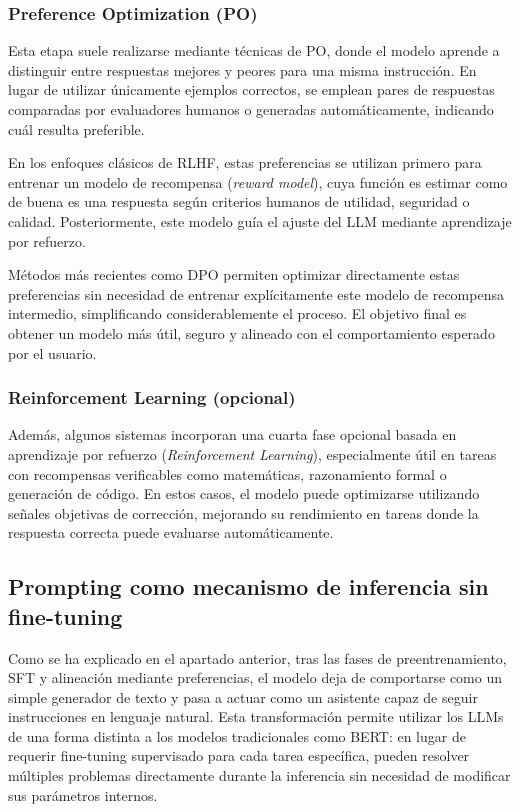 \subsubsection*{Preference Optimization (PO)}

Esta etapa suele realizarse mediante técnicas de \ac{PO}, donde el modelo aprende a distinguir entre respuestas mejores y peores para una misma instrucción. En lugar de utilizar únicamente ejemplos correctos, se emplean pares de respuestas comparadas por evaluadores humanos o generadas automáticamente, indicando cuál resulta preferible.

En los enfoques clásicos de \ac{RLHF}, estas preferencias se utilizan primero para entrenar un modelo de recompensa (\textit{reward model}), cuya función es estimar como de buena es una respuesta según criterios humanos de utilidad, seguridad o calidad. Posteriormente, este modelo guía el ajuste del \ac{LLM} mediante aprendizaje por refuerzo.

Métodos más recientes como \ac{DPO} \cite{rafailov_direct_2023} permiten optimizar directamente estas preferencias sin necesidad de entrenar explícitamente este modelo de recompensa intermedio, simplificando considerablemente el proceso. El objetivo final es obtener un modelo más útil, seguro y alineado con el comportamiento esperado por el usuario.

\subsubsection*{Reinforcement Learning (opcional)}

Además, algunos sistemas incorporan una cuarta fase opcional basada en aprendizaje por refuerzo (\textit{Reinforcement Learning}), especialmente útil en tareas con recompensas verificables como matemáticas, razonamiento formal o generación de código. En estos casos, el modelo puede optimizarse utilizando señales objetivas de corrección, mejorando su rendimiento en tareas donde la respuesta correcta puede evaluarse automáticamente.


\subsection{Prompting como mecanismo de inferencia sin fine-tuning}
\label{subsec:prompting}

Como se ha explicado en el apartado anterior, tras las fases de preentrenamiento, \ac{SFT} y alineación mediante preferencias, el modelo deja de comportarse como un simple generador de texto y pasa a actuar como un asistente capaz de seguir instrucciones en lenguaje natural. Esta transformación permite utilizar los \acp{LLM} de una forma distinta a los modelos tradicionales como \ac{BERT}: en lugar de requerir fine-tuning supervisado para cada tarea específica, pueden resolver múltiples problemas directamente durante la inferencia sin necesidad de modificar sus parámetros internos.

